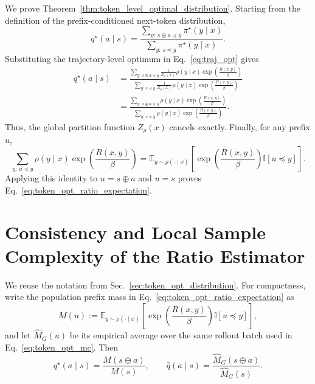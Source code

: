 \documentclass{article}
\begin{document}
We prove Theorem~\ref{thm:token_level_optimal_distribution}. Starting from the definition of the prefix-conditioned next-token distribution,
\begin{equation}
q^\star(a \mid s)
=
\frac{\sum_{y:\, s \oplus a \preceq y}\pi^\star(y \mid x)}
{\sum_{y:\, s \preceq y}\pi^\star(y \mid x)}.
\end{equation}
Substituting the trajectory-level optimum in Eq.~\eqref{eq:traj_opt} gives
\begin{align}
q^\star(a \mid s)
&=
\frac{
\sum_{y:\, s \oplus a \preceq y}
\frac{1}{Z_\rho(x)}\rho(y \mid x)
\exp\!\left(\frac{R(x,y)}{\beta}\right)
}{
\sum_{y:\, s \preceq y}
\frac{1}{Z_\rho(x)}\rho(y \mid x)
\exp\!\left(\frac{R(x,y)}{\beta}\right)
}
\nonumber\\
&=
\frac{
\sum_{y:\, s \oplus a \preceq y}
\rho(y \mid x)
\exp\!\left(\frac{R(x,y)}{\beta}\right)
}{
\sum_{y:\, s \preceq y}
\rho(y \mid x)
\exp\!\left(\frac{R(x,y)}{\beta}\right)
}.
\end{align}
Thus, the global partition function $Z_\rho(x)$ cancels exactly. Finally, for any prefix $u$,
\begin{equation}
\sum_{y:\, u \preceq y}
\rho(y \mid x)
\exp\!\left(\frac{R(x,y)}{\beta}\right)
=
\mathbb{E}_{y \sim \rho(\cdot \mid x)}
\!\left[
\exp\!\left(\frac{R(x,y)}{\beta}\right)
\mathbb{I}[u \preceq y]
\right].
\end{equation}
Applying this identity to $u=s\oplus a$ and $u=s$ proves Eq.~\eqref{eq:token_opt_ratio_expectation}.



\section{Consistency and Local Sample Complexity of the Ratio Estimator}
\label{app:ratio_consistency}

We reuse the notation from Sec.~\ref{sec:token_opt_distribution}. For compactness,
write the population prefix mass in Eq.~\eqref{eq:token_opt_ratio_expectation} as
\begin{equation}
M(u)
:=
\mathbb{E}_{y\sim\rho(\cdot\mid x)}
\!\left[
\exp\!\left(\frac{R(x,y)}{\beta}\right)
\mathbb{I}[u\preceq y]
\right],
\end{equation}
and let $\widehat M_G(u)$ be its empirical average over the same rollout batch
used in Eq.~\eqref{eq:token_opt_mc}. Then
\begin{equation}
q^\star(a\mid s)=\frac{M(s\oplus a)}{M(s)},
\qquad
\widehat q(a\mid s)
=
\frac{\widehat M_G(s\oplus a)}{\widehat M_G(s)}.
\end{equation}
\end{document}
